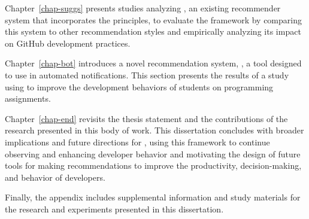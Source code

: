 Chapter~\ref{chap-suggs} presents studies analyzing \suggs, an existing recommender system that incorporates the \framework principles, to evaluate the framework by comparing this system to other recommendation styles and empirically analyzing its impact on GitHub development practices.

Chapter~\ref{chap-bot} introduces a novel recommendation system, \tooltwo, a tool designed to use \framework in automated notifications. This section presents the results of a study using \tooltwo to improve the development behaviors of students on programming assignments.

Chapter~\ref{chap-end} revisits the thesis statement and the contributions of the research presented in this body of work. This dissertation concludes with broader implications and future directions for \framework, using this framework to continue observing and enhancing developer behavior and motivating the design of future tools for making recommendations to improve the productivity, decision-making, and behavior of developers.

Finally, the appendix includes supplemental information and study materials for the research and experiments presented in this dissertation.




